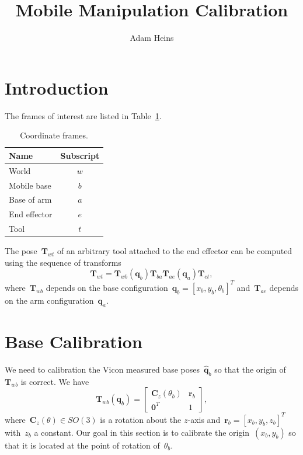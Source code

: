 \documentclass{article}
\title{Mobile Manipulation Calibration}
\author{Adam Heins}
\begin{document}
\maketitle

\section{Introduction}

The frames of interest are listed in Table~\ref{tab:frames}.

\begin{table}[h]
  \caption{Coordinate frames.}
  \centering
    \begin{tabular}{l c}
      \toprule
      Name & Subscript \\
      \midrule
      World        & $w$ \\
      Mobile base  & $b$ \\
      Base of arm  & $a$ \\
      End effector & $e$  \\
      Tool         & $t$ \\
      \bottomrule
    \end{tabular}
  \label{tab:frames}
\end{table}

The pose~$\bm{T}_{wt}$ of an arbitrary tool attached to the end effector can be
computed using the sequence of transforms
\begin{equation}\label{eq:kinematic_chain}
  \bm{T}_{wt} = \bm{T}_{wb}(\bm{q}_b)\bm{T}_{ba}\bm{T}_{ae}(\bm{q}_a)\bm{T}_{et},
\end{equation}
where~$\bm{T}_{wb}$ depends on the base
configuration~$\bm{q}_b=[x_b,y_b,\theta_b]^T$ and~$\bm{T}_{ae}$ depends on the
arm configuration~$\bm{q}_a$.

\section{Base Calibration}

We need to calibration the Vicon measured base poses~$\hat{\bm{q}}_b$ so that
the origin of~$\bm{T}_{wb}$ is correct. We have
\begin{equation}
  \bm{T}_{wb}(\bm{q}_b) = \begin{bmatrix}
    \bm{C}_z(\theta_b) & \bm{r}_b \\
    \bm{0}^T & 1
  \end{bmatrix},
\end{equation}
where~$\bm{C}_z(\theta)\in SO(3)$ is a rotation about the $z$-axis
and~$\bm{r}_b=[x_b,y_b,z_b]^T$ with~$z_b$ a constant. Our goal in this section
is to calibrate the origin~$(x_b,y_b)$ so that it is located at the point of
rotation of~$\theta_b$.
\end{document}
